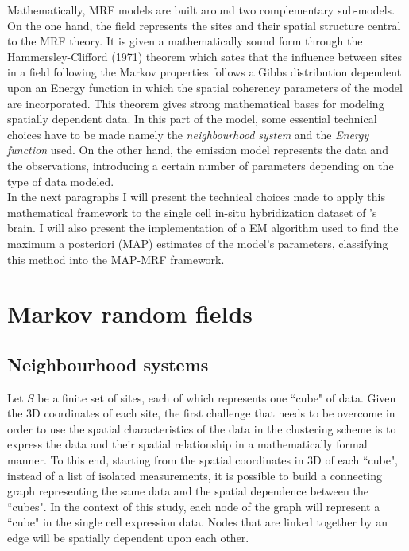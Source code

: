 	 Mathematically, MRF models are built around two complementary sub-models. On the one hand, the field represents the sites and their spatial structure central to the MRF theory. It is given a mathematically sound form through the Hammersley-Clifford (1971) theorem which sates that the influence between sites in a field following the Markov properties follows a Gibbs distribution dependent upon an Energy function in which the spatial coherency parameters of the model are incorporated. This theorem gives strong mathematical bases for modeling spatially dependent data. In this part of the model, some essential technical choices have to be made namely the \emph{neighbourhood system} and the \emph{Energy function} used. On the other hand, the emission model represents the data and the observations, introducing a certain number of parameters depending on the type of data modeled.\\
	 
	 In the next paragraphs I will present the technical choices made to apply this mathematical framework to the single cell in-situ hybridization dataset of \platy{}'s brain. I will also present the implementation of a EM algorithm used to find the maximum a posteriori (MAP) estimates of the model's parameters, classifying this method into the MAP-MRF framework.

\section{Markov random fields}
	

	\subsection{Neighbourhood systems}\label{sec:neighbours}
Let $S$ be a finite set of sites, each of which represents one ``cube" of data. Given the 3D coordinates of each site, the first challenge that needs to be overcome in order to use the spatial characteristics of the data in the clustering scheme is to express the data and their spatial relationship in a mathematically formal manner. To this end, starting from the spatial coordinates in 3D of each ``cube", instead of a list of isolated measurements, it is possible to build a connecting graph representing the same data and the spatial dependence between the ``cubes". In the context of this study, each node of the graph will represent a ``cube" in the single cell expression data. Nodes that are linked together by an edge will be spatially dependent upon each other.\\

